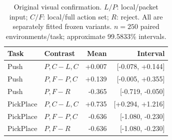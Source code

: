 \begin{table}[tb]
\centering\small
\caption{Original visual confirmation. $L/P$: local/packet input; $C/F$: local/full action set; $R$: reject. All are separately fitted frozen variants. $n=250$ paired environments/task; approximate 99.5833\% intervals.}\label{tab:visual}
\begin{tabular}{llrr}
\toprule Task & Contrast & Mean & Interval\\
\midrule
Push & $P,C-L,C$ & +0.007 & [-0.078, +0.144]\\
Push & $P,F-P,C$ & +0.139 & [-0.005, +0.355]\\
Push & $P,F-R$ & -0.365 & [-0.719, -0.050]\\
PickPlace & $P,C-L,C$ & +0.735 & [+0.294, +1.216]\\
PickPlace & $P,F-P,C$ & -0.636 & [-1.080, -0.230]\\
PickPlace & $P,F-R$ & -0.636 & [-1.080, -0.230]\\
\bottomrule
\end{tabular}
\end{table}
